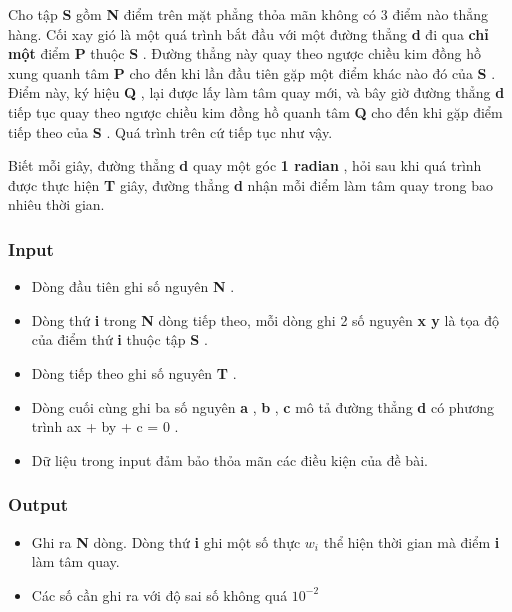 



   Cho tập   \textbf{    S   }   gồm   \textbf{    N   }   điểm trên mặt phẳng thỏa mãn không có 3 điểm nào thẳng hàng.   Cối xay gió   là một quá trình bắt đầu với một đường thẳng   \textbf{    d   }   đi qua   \textbf{    chỉ một   }   điểm   \textbf{    P   }   thuộc   \textbf{    S   }   . Đường thẳng này quay theo ngược chiều kim đồng hồ xung quanh tâm   \textbf{    P   }   cho đến khi lần đầu tiên gặp một điểm khác nào đó của   \textbf{    S   }   . Điểm này, ký hiệu   \textbf{    Q   }   , lại được lấy làm tâm quay mới, và bây giờ đường thẳng   \textbf{    d   }   tiếp tục quay theo ngược chiều kim đồng hồ quanh tâm   \textbf{    Q   }   cho đến khi gặp điểm tiếp theo của   \textbf{    S   }   . Quá trình trên cứ tiếp tục như vậy.  

   Biết mỗi giây, đường thẳng   \textbf{    d   }   quay một góc   \textbf{    1 radian   }   , hỏi sau khi quá trình được thực hiện   \textbf{    T   }   giây, đường thẳng   \textbf{    d   }   nhận mỗi điểm làm tâm quay trong bao nhiêu thời gian.  

\subsubsection{   Input  }
\begin{itemize}
	\item     Dòng đầu tiên ghi số nguyên    \textbf{     N    }    .   
	\item     Dòng thứ    \textbf{     i    }    trong    \textbf{     N    }    dòng tiếp theo, mỗi dòng ghi 2 số nguyên    \textbf{     x y    }    là tọa độ của điểm thứ    \textbf{     i    }    thuộc tập    \textbf{     S    }    .   
	\item     Dòng tiếp theo ghi số nguyên    \textbf{     T    }    .   
	\item     Dòng cuối cùng ghi ba số nguyên    \textbf{     a    }    ,    \textbf{     b    }    ,    \textbf{     c    }    mô tả đường thẳng    \textbf{     d    }    có phương trình    ax + by + c = 0    .   
	\item     Dữ liệu trong input đảm bảo thỏa mãn các điều kiện của đề bài.   
\end{itemize}

\subsubsection{   Output  }
\begin{itemize}
	\item     Ghi ra    \textbf{     N    }    dòng. Dòng thứ    \textbf{     i    }    ghi một số thực    \textbf{     $w_{i}$}    thể hiện thời gian mà điểm    \textbf{     i    }    làm tâm quay.   
	\item     Các số cần ghi ra với độ sai số không quá $10^{-2}$
\end{itemize}

